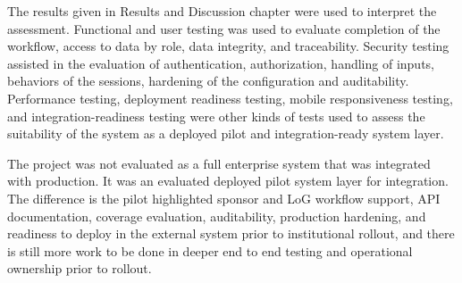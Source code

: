 The results given in Results and Discussion chapter were used to interpret the assessment. Functional and user testing was used to evaluate completion of the workflow, access to data by role, data integrity, and traceability. Security testing assisted in the evaluation of authentication, authorization, handling of inputs, behaviors of the sessions, hardening of the configuration and auditability. Performance testing, deployment readiness testing, mobile responsiveness testing, and integration-readiness testing were other kinds of tests used to assess the suitability of the system as a deployed pilot and integration-ready system layer. 

The project was not evaluated as a full enterprise system that was integrated with production. It was an evaluated deployed pilot system layer for integration. The difference is the pilot highlighted sponsor and LoG workflow support, API documentation, coverage evaluation, auditability, production hardening, and readiness to deploy in the external system prior to institutional rollout, and there is still more work to be done in deeper end to end testing and operational ownership prior to rollout.
